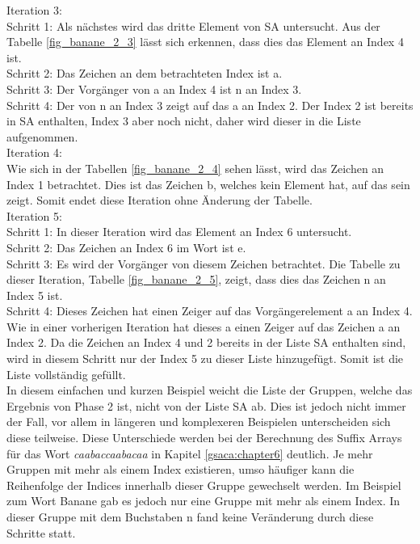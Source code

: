 Iteration 3: \\
Schritt 1: Als nächstes wird das dritte Element von SA untersucht. 
Aus der Tabelle \ref{fig_banane_2_3} lässt sich erkennen, dass dies das Element an Index 4 ist.\\
Schritt 2: Das Zeichen an dem betrachteten Index ist a.\\
Schritt 3: Der Vorgänger von a an Index 4 ist n an Index 3.\\
Schritt 4: Der \prevpointer von n an Index 3 zeigt auf das a an Index 2. 
Der Index 2 ist bereits in SA enthalten, Index 3 aber noch nicht, daher wird dieser in die Liste aufgenommen.\\

Iteration 4: \\
Wie sich in der Tabellen \ref{fig_banane_2_4} sehen lässt, wird das Zeichen an Index 1 betrachtet. 
Dies ist das Zeichen b, welches kein Element hat, auf das sein \prevpointer zeigt. 
Somit endet diese Iteration ohne Änderung der Tabelle.\\

Iteration 5: \\
Schritt 1: In dieser Iteration wird das Element an Index 6 untersucht.\\
Schritt 2: Das Zeichen an Index 6 im Wort ist e.\\
Schritt 3: Es wird der Vorgänger von diesem Zeichen betrachtet. Die Tabelle zu dieser Iteration, Tabelle \ref{fig_banane_2_5}, zeigt, dass dies das Zeichen n an Index 5 ist.\\
Schritt 4: Dieses Zeichen hat einen Zeiger auf das Vorgängerelement a an Index 4. 
Wie in einer vorherigen Iteration hat dieses a einen Zeiger auf das Zeichen a an Index 2. 
Da die Zeichen an Index 4 und 2 bereits in der Liste SA enthalten sind, wird in diesem Schritt nur der Index 5 zu dieser Liste hinzugefügt. 
Somit ist die Liste vollständig gefüllt.\\

In diesem einfachen und kurzen Beispiel weicht die Liste der Gruppen, welche das Ergebnis von Phase 2 ist, nicht von der Liste SA ab.
Dies ist jedoch nicht immer der Fall, vor allem in längeren und komplexeren Beispielen unterscheiden sich diese teilweise. 
Diese Unterschiede werden bei der Berechnung des Suffix Arrays für das Wort \textit{caabaccaabacaa} in Kapitel \ref{gsaca:chapter6} deutlich. 
Je mehr Gruppen mit mehr als einem Index existieren, umso häufiger kann die Reihenfolge der Indices innerhalb dieser Gruppe gewechselt werden. 
Im Beispiel zum Wort Banane gab es jedoch nur eine Gruppe mit mehr als einem Index. 
In dieser Gruppe mit dem Buchstaben n fand keine Veränderung durch diese Schritte statt.\\

